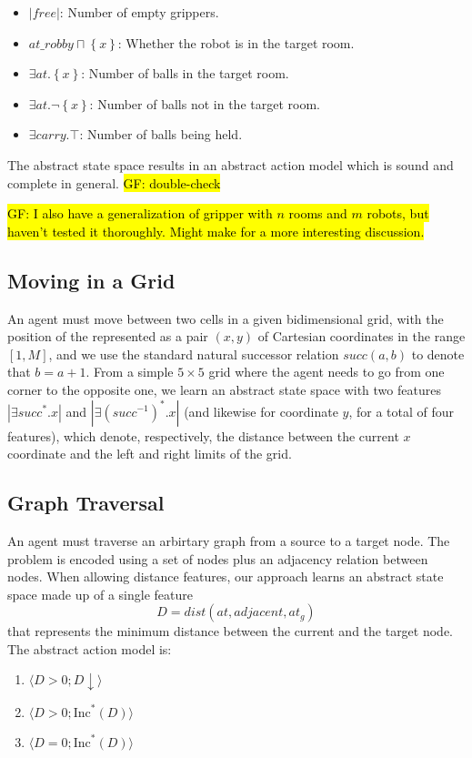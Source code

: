 \documentclass[12pt]{article}
\newcommand\gf[1]{\sethlcolor{yellow}\hl{GF: #1}}
\newcommand{\tuple}[1]{\ensuremath{\langle #1 \rangle}}
\newcommand{\set}[1]{\ensuremath{\left\{#1 \right\}}}
\newcommand{\abs}[1]{\ensuremath{\left\vert{#1}\right\vert}}
\newcommand{\RInc}{\ensuremath{\text{Inc}^*}}  %
\begin{document}
\begin{itemize}
 \item $\abs{free}$: Number of empty grippers.
 \item $at\_robby \sqcap \set{x}$: Whether the robot is in the target room.
 \item $\exists at . \set{x}$: Number of balls in the target room.
 \item $\exists at . \neg \set{x}$: Number of balls not in the target room.
 \item $\exists carry . \top$: Number of balls being held.
\end{itemize}

The abstract state space results in an abstract action model which is sound and complete in general.
\gf{double-check}

\gf{I also have a generalization of gripper with $n$ rooms and $m$ robots, but haven't tested it thoroughly. Might make for a more interesting discussion.}


        
\subsection{Moving in a Grid}

An agent must move between two cells in a given bidimensional grid, with
the position of the represented as a pair $(x, y)$ of Cartesian coordinates in the range $[1, M]$,
and we use the standard natural successor relation $succ(a, b)$ to denote that $b = a + 1$.
From a simple $5 \times 5$ grid where the agent needs to go from one corner to the opposite one, 
we learn an abstract state space 
with two features
$\abs{\exists succ^*. x}$ and
$\abs{\exists (succ^{-1})^*. x}$
(and likewise for coordinate $y$, for a total of four features),
which denote, respectively, the distance between the current $x$ coordinate and the left and right limits of the grid.

 


\subsection{Graph Traversal}

An agent must traverse an arbirtary graph from a source to a target node. The problem is encoded 
using a set of nodes plus an adjacency relation between nodes. When allowing distance features, our approach learns an abstract
state space made up of a single feature 
\[D = dist(at, adjacent, at_g)\]
that represents the minimum distance between the current and the target node. The abstract action model is:
\begin{enumerate}
 \item $\tuple{D>0; D\downarrow}$
 \item $\tuple{D>0; \RInc(D)}$
 \item $\tuple{D=0; \RInc(D)}$
\end{enumerate}
\end{document}
